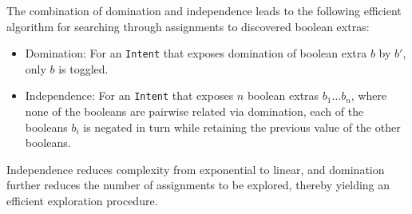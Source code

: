 The combination of domination and independence leads to the following efficient algorithm for searching through assignments to discovered boolean extras: 
\begin{itemize}
	\item Domination: For an {\tt Intent} that exposes domination of boolean extra $b$ by  $b'$, only $b$ is toggled.
	\item Independence: For an {\tt Intent} that exposes $n$ boolean extras $b_1 \ldots b_n$, where none of the booleans are pairwise related via domination, each of the booleans $b_i$ is negated in turn while retaining the previous value of the other booleans.
\end{itemize}
Independence reduces complexity from exponential to linear, and domination further reduces the number of assignments to be explored, thereby yielding an efficient exploration procedure.